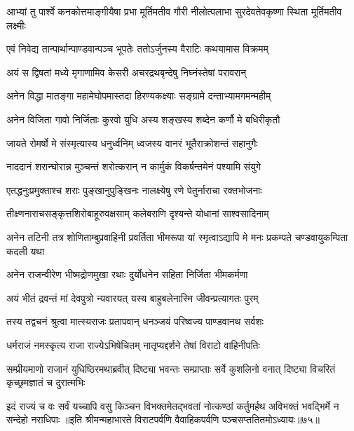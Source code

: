 \twolineshloka
{आभ्यां तु पार्श्वे कनकोत्तमाङ्गीयैषा प्रभा मूर्तिमतीव गौरी}
{नीलोत्पलाभा सुरदेवतेवकृष्णा स्थिता मूर्तिमतीव लक्ष्मीः}



\twolineshloka
{एवं निवेद्य तान्पार्थान्पाण्डवान्पञ्च भूपतेः}
{ततोऽर्जुनस्य वैराटिः कथयामास विक्रमम्}


\twolineshloka
{अयं स द्विषतां मध्ये मृगाणामिव केसरी}
{अचरद्रथबृन्देषु निघ्नंस्तेषां परावरान्}


\twolineshloka
{अनेन विद्धा मातङ्गा महामेघोपमास्तदा}
{हिरण्यकक्ष्याः सङ्ग्रामे दन्ताभ्यामगमन्महीम्}


\twolineshloka
{अनेन विजिता गावो निर्जिताः कुरवो युधि}
{अस्य शङ्खस्य शब्देन कर्णौ मे बधिरीकृतौ}


\twolineshloka
{जायते रोमर्षो मे संस्मृत्यास्य धनुर्ध्वनिम्}
{ध्वजस्य वानरं भूतैराक्रोशन्तं सहानुगैः}


\twolineshloka
{नाददानं शरान्घोरान्न मुञ्चन्तं शरोत्करान्}
{न कार्मुकं विकर्षन्तमेनं पश्यामि संयुगे}


\twolineshloka
{एतद्धनुःप्रमुक्ताश्च शराः पुङ्खानुपुङ्खिनः}
{नालक्ष्येषु रणे पेतुर्नाराचा रक्तभोजनाः}


\twolineshloka
{तीक्ष्णनाराचसङ्कृत्तशिरोबाहूरुवक्षसाम्}
{कलेबराणि दृश्यन्ते योधानां साश्वसादिनाम्}


\threelineshloka
{अनेन तटिनी तत्र शोणिताम्बुप्रवाहिनी}
{प्रवर्तिता भीमरूपा यां स्मृत्वाऽद्यापि मे मनः}
{प्रकम्पते चण्डवायुकम्पिता कदली यथा}


\twolineshloka
{अनेन राजन्वीरेण भीष्मद्रोणमुखा रथाः}
{दुर्योधनेन सहिता निर्जिता भीमकर्मणा}


\twolineshloka
{अयं भीतं द्रवन्तं मां देवपुत्रो न्यवारयत्}
{यस्य बाहुबलेनास्मि जीवन्प्रत्यागतः पुरम्}



\twolineshloka
{तस्य तद्वचनं श्रुत्वा मात्स्यराजः प्रतापवान्}
{धनञ्जयं परिष्वज्य पाण्डवानथ सर्वशः}


\twolineshloka
{धर्मराजं नमस्कृत्य राजा राज्येऽभिषेचितम्}
{नातृप्यद्दर्शने तेषां विराटो वाहिनीपतिः}


\threelineshloka
{सम्प्रीयमाणो राजानं युधिष्ठिरमथाब्रवीत्}
{दिष्ट्या भवन्तः सम्प्राप्ताः सर्वे कुशलिनो वनात्}
{दिष्ट्या विचरितं कृच्छ्रमज्ञातं च दुरात्मभिः}


\threelineshloka
{इदं राज्यं च वः सर्वं यच्चापि वसु किञ्चन}
{विभक्तमेतद्भवतां नोत्कण्ठां कर्तुमर्हथ}
{अविभक्तं भवद्भिर्मे न सन्देहो नराधिपाः}
॥इति श्रीमन्महाभारते विराटपर्वणि वैवाहिकपर्वणि पञ्चसप्ततितमोऽध्यायः॥७५॥

